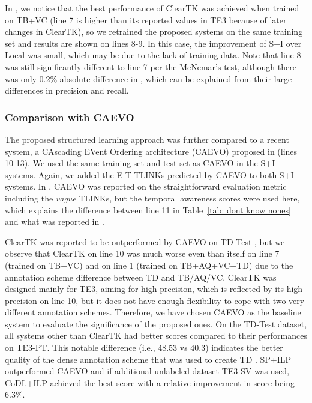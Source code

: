 \documentclass[11pt,letterpaper]{article}
\newcommand{\final}[1]{#1}
\begin{document}
{In \citet{uzzaman2013TE3}, we notice that the best performance of ClearTK was achieved when trained on TB+VC (line 7 is higher than its reported values in TE3 because of later changes in ClearTK), so we retrained the proposed systems on the same training set and results are shown on lines 8-9.
In this case, the improvement of S+I over Local was small, which may be due to the lack of training data. Note that line 8 was still significantly different to line 7 per the McNemar's test, although there was only 0.2\% absolute difference in , which can be explained from their large differences in precision and recall.

\subsubsection{\final{Comparison with CAEVO}}
The proposed structured learning approach was further compared to a recent system, a CAscading EVent Ordering architecture (CAEVO) proposed in \citet{chambers2014dense} (lines 10-13).
We used the same training set and test set as CAEVO in the S+I systems. Again, we added the E-T TLINKs predicted by CAEVO to both S+I systems.
In \citet{chambers2014dense}, CAEVO was reported on the straightforward evaluation metric including the {\em vague} TLINKs, but the temporal awareness scores were used here, which explains the difference between line 11 \final{in Table~\ref{tab: dont know nones}} and \final{what was reported in} \citet{chambers2014dense}.

ClearTK was reported to be outperformed by CAEVO on TD-Test \citep{chambers2014dense}, but we observe that ClearTK on line 10 was much worse even than itself \final{on line 7 (trained on TB+VC) and on line 1 (trained on TB+AQ+VC+TD)} due to the annotation scheme difference between TD and TB/AQ/VC. 
\final{ClearTK was designed mainly for TE3, aiming for high precision, which is reflected by its high precision on line 10, but it does not have enough flexibility to cope with two very different annotation schemes.}
Therefore, we have chosen CAEVO as the baseline system to evaluate the significance of the proposed ones.
On the TD-Test dataset, all systems other than ClearTK had better  scores compared to their performances on TE3-PT. This notable difference (i.e., 48.53 vs 40.3) indicates the better quality of the dense annotation scheme that was used to create TD \citep{cassidy2014annotation}.
SP+ILP outperformed CAEVO and if additional unlabeled dataset TE3-SV was used, CoDL+ILP achieved the best score with a relative improvement in  score being 6.3\%.

}
\end{document}
